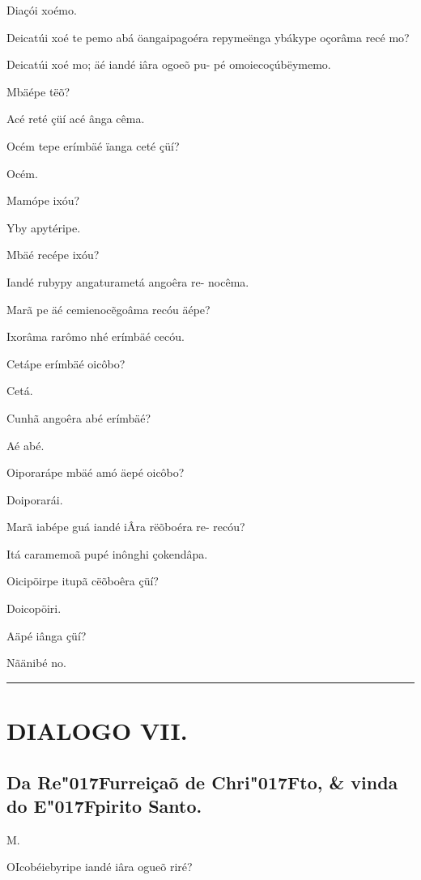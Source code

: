\documentclass[openany,titlepage,12pt]{book}
\renewcommand{\chaptermark}[1]{\markboth{#1}{}}
\renewcommand{\sectionmark}[1]{\gdef\rightmark{#1}}
\newcommand{\lgS}{\char"017F}
\newcommand{\comecalista}[5]{
    \hspace*{-11.7pt}
    \begin{minipage}[t]{0.08\linewidth}
        \flushright #1\\#2
    \end{minipage}
    \hspace{0pt}
    \begin{minipage}[t]{0.94\linewidth}
        \lettrine
        [findent =2pt, nindent=0pt,  lines=2]
        {#3}{#4}#5
    \end{minipage}
    \vspace*{-3pt}
}
\begin{document}
\begin{altereven}
    \item Diaçói xoémo.
    \item Deicatúi xoé te pemo abá öangaipagoéra
    repymeënga ybákype oçorâma recé mo?
    \item Deicatúi xoé mo; äé iandé iâra ogoeõ pu-
    pé omoiecoçúbëymemo.
    \item Mbäépe tëõ?
    \item Acé reté çüí acé ânga cêma.
    \item Océm tepe erímbäé ïanga ceté çüí?
    \item Océm.
    \item Mamópe ixóu?
    \item Yby apytéripe.
    \item Mbäé recépe ixóu?
    \item Iandé rubypy angaturametá angoêra re-
    nocêma.
    \item Marã pe äé cemienoc\~egoâma recóu äépe?
    \item Ixorâma rarômo nhé erímbäé cecóu.
    \item Cetápe erímbäé oicôbo?
    \item Cetá.
    \item Cunhã angoêra abé erímbäé?
    \item Aé abé.
    \item Oiporarápe mbäé amó äepé oicôbo?
    \item Doiporarái.
    \item Marã iabépe guá iandé iÂra rëõboéra re-
    recóu?
    \item Itá caramemoã pupé inônghi çokendâpa.
    \item Oicipöirpe itupã cëõboêra çüí?
    \item Doicopöiri.
    \item Aäpé iânga çüí?
    \item Nãänibé no.
\end{altereven}

\newpage

\vspace{2pt}
\par\noindent\rule{\textwidth}{0.4pt}
\unskip\vspace*{2pt}
\section{DIALOGO VII.}
\subsection{Da Re\lgS urreiçaõ de Chri\lgS to, \& vinda\\
do E\lgS pirito Santo.}

\chaptermark{Dialogo VII.}
\sectionmark{Da Re\lgS urreiçaõ de Chri\lgS to.}
\vspace*{2pt}

\comecalista{M.}{}{O}{I}
    {cobéiebyripe iandé iâra ogueõ riré?}
\end{document}
